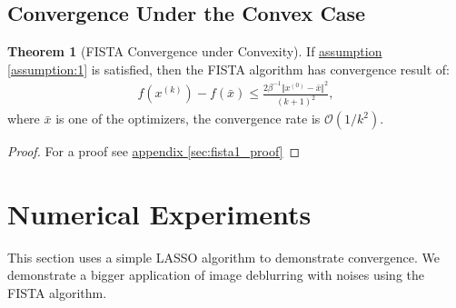 \documentclass[]{article}
\theoremstyle{definition}
\newtheorem{theorem}{Theorem}       %
\begin{document}
    \subsection{Convergence Under the Convex Case}
        \begin{theorem}[FISTA Convergence under Convexity]\label{thm:fista_convergence1}
            If \hyperref[assumption:1]{assumption \ref*{assumption:1}} is satisfied, then the FISTA algorithm has convergence result of: 
            \begin{align*}
                f(x^{(k)}) - f(\bar x) \le 
                \frac{2\beta^{-1}\Vert x^{(0)} - \bar x\Vert^2}
            {(k + 1)^2},
            \end{align*}
            where $\bar x$ is one of the optimizers, the convergence rate is $\mathcal O(1/k^2)$. 
        \end{theorem}
        \begin{proof}
            For a proof see \hyperref[sec:fista1_proof]{appendix \ref*{sec:fista1_proof}}
        \end{proof}

\section{Numerical Experiments}\label{sec:numerical_experiments}
    This section uses a simple LASSO algorithm to demonstrate convergence. We demonstrate a bigger application of image deblurring with noises using the FISTA algorithm. 
\end{document}
